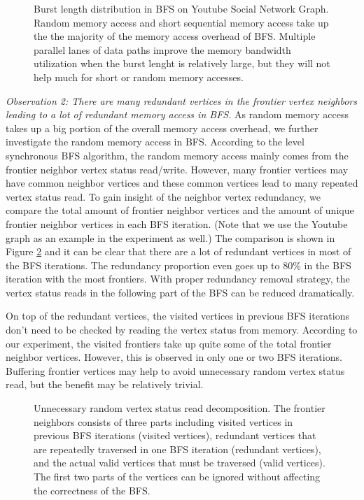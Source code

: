 \begin{figure}
\caption{Burst length distribution in BFS on Youtube Social Network Graph. 
    Random memory access and short sequential memory access take up the 
    the majority of the memory access overhead of BFS. Multiple parallel 
    lanes of data paths improve the memory bandwidth utilization when the 
    burst lenght is relatively large, but they will not help much 
    for short or random memory accesses.}
\label{fig:burst-len-youtube}
\end{figure}

\textit{Observation 2: There are many redundant vertices in the 
frontier vertex neighbors leading to a lot of redundant memory access in BFS.} 
As random memory access takes up a big portion of the overall memory 
access overhead, we further investigate the random memory access in BFS. 
According to the level synchronous BFS algorithm, the random memory access mainly comes 
from the frontier neighbor vertex status read/write. 
However, many frontier vertices may have common neighbor vertices and these common 
vertices lead to many repeated vertex status read. To gain insight of the neighbor 
vertex redundancy, we compare the total amount of frontier 
neighbor vertices and the amount of unique frontier neighbor vertices in each BFS iteration.
(Note that we use the Youtube graph as an example in the experiment as well.) 
The comparison is shown in Figure \ref{fig:repeat-neighbor} and it can be clear 
that there are a lot of redundant vertices in most of the BFS iterations. 
The redundancy proportion even goes up to 80\% in the BFS iteration with the most frontiers. 
With proper redundancy removal strategy, the vertex status reads in the following 
part of the BFS can be reduced dramatically.

On top of the redundant vertices, the visited vertices in previous 
BFS iterations don't need to be checked by reading the vertex status 
from memory. According to our experiment, the visited frontiers 
take up quite some of the total frontier neighbor vertices. However, this is 
observed in only one or two BFS iterations. Buffering 
frontier vertices may help to avoid unnecessary random vertex status read, 
but the benefit may be relatively trivial.  

\begin{figure}
\caption{Unnecessary random vertex status read decomposition. 
    The frontier neighbors consists of three parts including visited vertices 
    in previous BFS iterations (visited vertices), 
    redundant vertices that are repeatedly traversed in one BFS iteration (redundant vertices), 
    and the actual valid vertices that must be traversed (valid vertices). 
    The first two parts of the vertices can be ignored without 
    affecting the correctness of the BFS.}
\label{fig:repeat-neighbor}
\end{figure}


